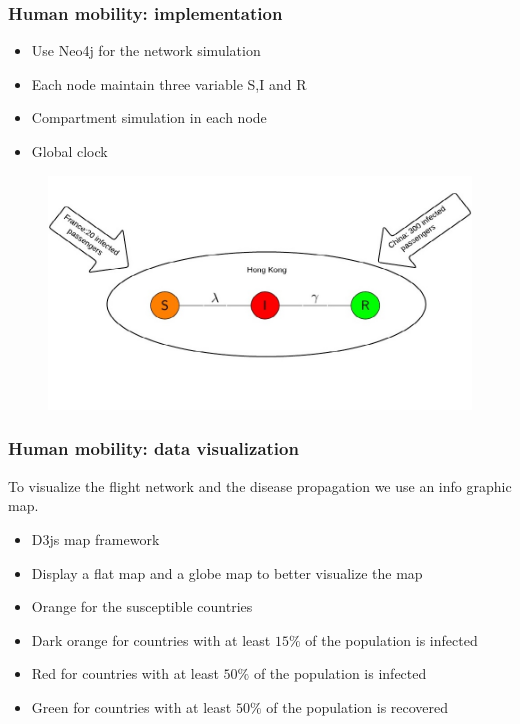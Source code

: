 \documentclass{beamer}
\begin{document}
\begin{frame}
\frametitle{Human mobility: implementation}
\begin{itemize}
\item Use Neo4j for the network simulation
\item Each node maintain three variable S,I and R
\item Compartment simulation in each node
\item Global clock
\end{itemize}
\begin{figure}[H]\label{fig:perc_diff}
\centering	
\includegraphics[scale=0.6]{img/flight.jpeg}
\end{figure}

\end{frame}

\begin{frame}
\frametitle{Human mobility: data visualization}
To visualize the flight network and the disease propagation we use an info graphic map. 
\begin{itemize}
\item D3js map framework
\item Display a flat map and a globe map to better visualize the map
\item Orange for the susceptible countries
\item Dark orange for countries with at least $15\%$ of the population is infected
\item Red for countries with at least $50\%$ of the population is infected
\item Green for countries with at least $50\%$ of the population is recovered
\end{itemize} 


\end{frame}
\end{document}
